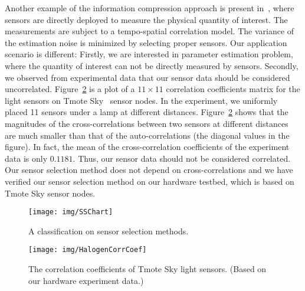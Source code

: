     Another example of the information compression approach is present in~\cite{VuranSpatioTemporal04}, where sensors are directly deployed to measure the physical quantity of interest. The measurements are subject to a tempo-spatial correlation model. The variance of the estimation noise is minimized by selecting proper sensors.
    Our application scenario is different: Firstly, we are interested in parameter estimation problem, where the quantity of interest can not be directly measured by sensors. Secondly, we observed from experimental data that our sensor data should be considered uncorrelated. Figure~\ref{f:sensorIID} is a plot of a $11\times 11$ correlation coefficients matrix for the light sensors on Tmote Sky~\cite{TmoteSkyDS2006} sensor nodes. In the experiment, we uniformly placed 11 sensors under a lamp at different distances. Figure~\ref{f:sensorIID} shows that the magnitudes of the cross-correlations between two sensors at different distances are much smaller than that of the auto-correlations (the diagonal values in the figure). In fact, the mean of the cross-correlation coefficients of the experiment data is only $0.1181$. Thus, our sensor data should not be considered correlated.
    Our sensor selection method does not depend on cross-correlations and we have verified our sensor selection method on our hardware testbed, which is based on Tmote Sky sensor nodes.


\begin{figure}
  \centering
  \texttt{[image: img/SSChart]}\\
  \caption{A classification on sensor selection methods.}\label{f:ssChart}
\end{figure}


\begin{figure}
  \centering
  \texttt{[image: img/HalogenCorrCoef]}\\
  \caption{The correlation coefficients of Tmote Sky light sensors. (Based on our hardware experiment data.)}\label{f:sensorIID}
\end{figure}


